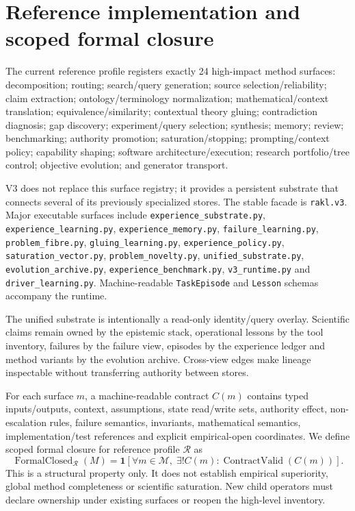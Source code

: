 \section{Reference implementation and scoped formal closure}
The current reference profile registers exactly 24 high-impact method surfaces: decomposition; routing; search/query generation; source selection/reliability; claim extraction; ontology/terminology normalization; mathematical/context translation; equivalence/similarity; contextual theory gluing; contradiction diagnosis; gap discovery; experiment/query selection; synthesis; memory; review; benchmarking; authority promotion; saturation/stopping; prompting/context policy; capability shaping; software architecture/execution; research portfolio/tree control; objective evolution; and generator transport.


V3 does not replace this surface registry; it provides a persistent substrate that connects several of its previously specialized stores. The stable facade is \texttt{rakl.v3}. Major executable surfaces include \texttt{experience\_substrate.py}, \texttt{experience\_learning.py}, \texttt{experience\_memory.py}, \texttt{failure\_learning.py}, \texttt{problem\_fibre.py}, \texttt{gluing\_learning.py}, \texttt{experience\_policy.py}, \texttt{saturation\_vector.py}, \texttt{problem\_novelty.py}, \texttt{unified\_substrate.py}, \texttt{evolution\_archive.py}, \texttt{experience\_benchmark.py}, \texttt{v3\_runtime.py} and \texttt{driver\_learning.py}. Machine-readable \texttt{TaskEpisode} and \texttt{Lesson} schemas accompany the runtime.

The unified substrate is intentionally a read-only identity/query overlay. Scientific claims remain owned by the epistemic stack, operational lessons by the tool inventory, failures by the failure view, episodes by the experience ledger and method variants by the evolution archive. Cross-view edges make lineage inspectable without transferring authority between stores.

For each surface $m$, a machine-readable contract $C(m)$ contains typed inputs/outputs, context, assumptions, state read/write sets, authority effect, non-escalation rules, failure semantics, invariants, mathematical semantics, implementation/test references and explicit empirical-open coordinates. We define scoped formal closure for reference profile $\mathcal R$ as
\begin{equation}\operatorname{FormalClosed}_{\mathcal R}(M)=\mathbf 1\!\left[\forall m\in\mathcal M,\;\exists!C(m):\operatorname{ContractValid}(C(m))\right].\end{equation}
This is a structural property only. It does not establish empirical superiority, global method completeness or scientific saturation. New child operators must declare ownership under existing surfaces or reopen the high-level inventory.

